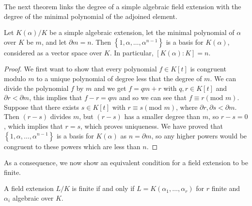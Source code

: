 The next theorem links the degree of a simple algebraic field extension with the degree of the minimal polynomial of the adjoined element. 
\begin{theorem} \label{thm:degree-theorem}
    Let $K(\alpha) / K$ be a simple algebraic extension, let the minimal polynomial of $\alpha$ over $K$ be $m$, and let $\partial m=n$. Then $\left\{1, \alpha, \ldots, \alpha^{n-1}\right\}$ is a basis for $K(\alpha)$, considered as a vector space over $K$. In particular, \([K(\alpha):K]=n\). \label{algebraic case}
\end{theorem}

\begin{proof}
    We first want to show that every polynomial \(f \in K[t]\) is congruent modulo \(m\) to a unique polynomial of degree less that the degree of \(m\). We can divide the polynomial \(f\) by \(m\) and we get \(f = qm + r\) with \(q,r \in K[t]\) and \(\partial r < \partial m\), this implies that \(f - r =qm\) and so we can see that \(f \equiv r (\text{mod } m)\). Suppose that there exists \(s \in K[t]\) with \(r \equiv s(\text{mod }m)\), where \(\partial r, \partial s < \partial m\). Then \((r - s)\) divides \(m\), but \((r-s)\) has a smaller degree than \(m\), so \(r-s=0\), which implies that \(r=s\), which proves uniqueness. We have proved that $\left\{1, \alpha, \ldots, \alpha^{n-1}\right\}$ is a basis for \(K(\alpha)\) as \(n = \partial m\), so any higher powers would be congruent to these powers which are less than \(n\).
    \end{proof}

%
As a consequence, we now show an equivalent condition for a field extension to be finite. 

\begin{theorem} \label{thm:finite-equi-def}
    A field extension $L/K$ is finite if and only if $L = K(\alpha_1, \dots, \alpha_r)$ for $r$ finite and $\alpha_i$ algebraic over $K$. 
\end{theorem}

